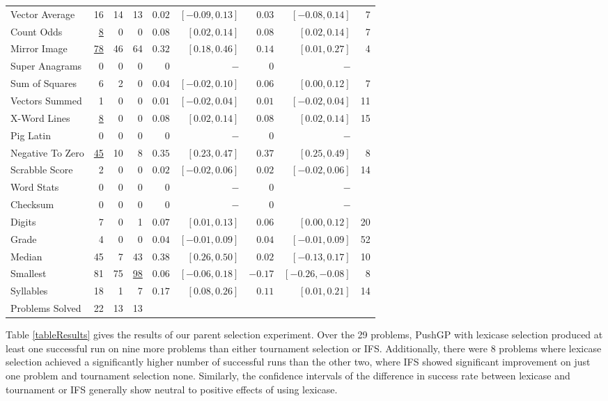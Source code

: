 \documentclass{sig-alternate}
\begin{document}
\begin{table*}[t]
\begin{tabular}{lrrr|rrrr|r}
Vector Average  & 16            & 14      & 13        & $0.02$ & $[-0.09, 0.13]$ & $0.03$ & $[-0.08, 0.14]$ & 7 \tabularnewline
Count Odds   & \underline{8}               & 0       & 0          & $0.08$ & $[0.02, 0.14]$ & $0.08$ & $[0.02, 0.14]$ & 7 \tabularnewline
Mirror Image   & \underline{78}              & 46      & 64       & $0.32$ & $[0.18, 0.46]$ & $0.14$ & $[0.01, 0.27]$ & 4 \tabularnewline
Super Anagrams             & 0       & 0   & 0        & $0$ & $-$ & $0$ & $-$ &  \tabularnewline
Sum of Squares  & 6             & 2       & 0         & $0.04$ & $[-0.02, 0.10]$ & $0.06$ & $[0.00, 0.12]$ & 7 \tabularnewline
Vectors Summed    & 1           & 0       & 0         & $0.01$ & $[-0.02, 0.04]$ & $0.01$ & $[-0.02, 0.04]$ & 11 \tabularnewline
X-Word Lines    & \underline{8}              & 0       & 0        & $0.08$ & $[0.02, 0.14]$ & $0.08$ & $[0.02, 0.14]$ & 15 \tabularnewline
Pig Latin                  & 0       & 0   & 0        &   $0$ & $-$ & $0$ & $-$ &  \tabularnewline
Negative To Zero  & \underline{45}           & 10      & 8        & $0.35$ & $[0.23, 0.47]$ & $0.37$ & $[0.25, 0.49]$ & 8 \tabularnewline
Scrabble Score    & 2             & 0       & 0       & $0.02$ & $[-0.02, 0.06]$ & $0.02$ & $[-0.02, 0.06]$ & 14 \tabularnewline
Word Stats                 & 0       & 0   & 0        & $0$ & $-$ & $0$ & $-$ &  \tabularnewline
Checksum                   & 0       & 0   & 0        &  $0$ & $-$ & $0$ & $-$ &  \tabularnewline
Digits    & 7                     & 0       & 1       & $0.07$ & $[0.01, 0.13]$ & $0.06$ & $[0.00, 0.12]$ & 20 \tabularnewline
Grade      & 4                    & 0       & 0       & $0.04$ & $[-0.01, 0.09]$ & $0.04$ & $[-0.01, 0.09]$ & 52 \tabularnewline
Median    & 45                   & 7       & 43       & $0.38$ & $[0.26, 0.50]$ & $0.02$ & $[-0.13, 0.17]$ & 10 \tabularnewline
Smallest   & 81                   & 75      & \underline{98}      & $0.06$ & $[-0.06, 0.18]$ & $-0.17$ & $[-0.26, -0.08]$ & 8 \tabularnewline
Syllables   & 18                 & 1       & 7        & $0.17$ & $[0.08, 0.26]$ & $0.11$ & $[0.01, 0.21]$ & 14 \tabularnewline
\midrule
\rowcolor{white} Problems Solved     & 22       & 13       & 13     & & & & &   \\
\bottomrule
\end{tabular}
\end{table*}


Table \ref{tableResults} gives the results of our parent selection experiment. Over the 29 problems, PushGP with lexicase selection produced at least one successful run on nine more problems than either tournament selection or IFS. Additionally, there were 8 problems where lexicase selection achieved a significantly higher number of successful runs than the other two, where IFS showed significant improvement on just one problem and tournament selection none. Similarly, the confidence intervals of the difference in success rate between lexicase and tournament or IFS generally show neutral to positive effects of using lexicase.
\end{document}
